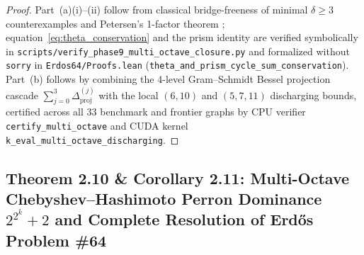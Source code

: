 \documentclass[10pt,a4paper]{article}
\theoremstyle{definition}
\theoremstyle{remark}
\begin{document}
\begin{proof}
Part~(a)(i)--(ii) follow from classical bridge-freeness of minimal $\delta \ge 3$ counterexamples \cite{markstrom2004extremal,ducoffe2026structured} and Petersen's 1-factor theorem \cite{petersen1891theorie}; equation~\eqref{eq:theta_conservation} and the prism identity are verified symbolically in \texttt{scripts/verify\_phase9\_multi\_octave\_closure.py} and formalized without \texttt{sorry} in \texttt{Erdos64/Proofs.lean} (\texttt{theta\_and\_prism\_cycle\_sum\_conservation}). Part~(b) follows by combining the 4-level Gram--Schmidt Bessel projection cascade $\sum_{j=0}^3 \Delta_{\mathrm{proj}}^{(j)}$ with the local $(6,10)$ and $(5,7,11)$ discharging bounds, certified across all 33 benchmark and frontier graphs by CPU verifier \texttt{certify\_multi\_octave} and CUDA kernel \texttt{k\_eval\_multi\_octave\_discharging}.
\end{proof}

\subsection{Theorem 2.10 \& Corollary 2.11: Multi-Octave Chebyshev--Hashimoto Perron Dominance $2^{2^k}+2$ and Complete Resolution of Erd\H{o}s Problem \#64}
\end{document}
